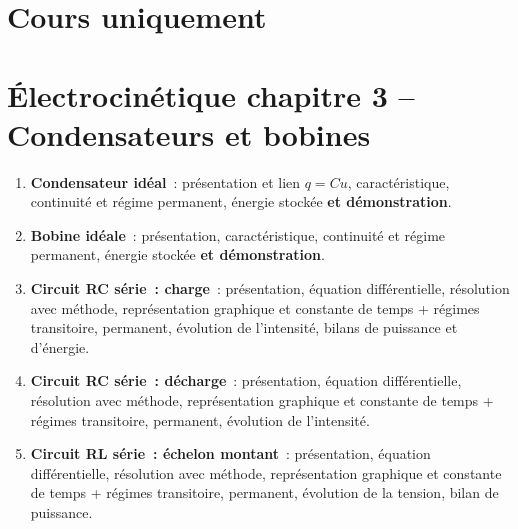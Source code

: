 \documentclass[a4paper, 12pt, final, garamond]{book}
\begin{document}
\section{Cours uniquement}

\section*{Électrocinétique chapitre 3 -- Condensateurs et bobines}
\begin{enumerate}[label=\Roman*]
    \item \textbf{Condensateur idéal}~: présentation et lien $q=Cu$,
        caractéristique, continuité et régime permanent, énergie stockée
        \textbf{et démonstration}.
    \item \textbf{Bobine idéale}~: présentation, caractéristique, continuité et
        régime permanent, énergie stockée \textbf{et démonstration}.
    \item \textbf{Circuit RC série~: charge}~: présentation, équation
        différentielle, résolution avec méthode, représentation graphique et
        constante de temps + régimes transitoire, permanent, évolution de
        l'intensité, bilans de puissance et d'énergie.
    \item \textbf{Circuit RC série~: décharge}~: présentation, équation
        différentielle, résolution avec méthode, représentation graphique et
        constante de temps + régimes transitoire, permanent, évolution de
        l'intensité.
    \item \textbf{Circuit RL série~: échelon montant}~: présentation, équation
        différentielle, résolution avec méthode, représentation graphique et
        constante de temps + régimes transitoire, permanent, évolution de
        la tension, bilan de puissance.
\end{enumerate}
\end{document}
